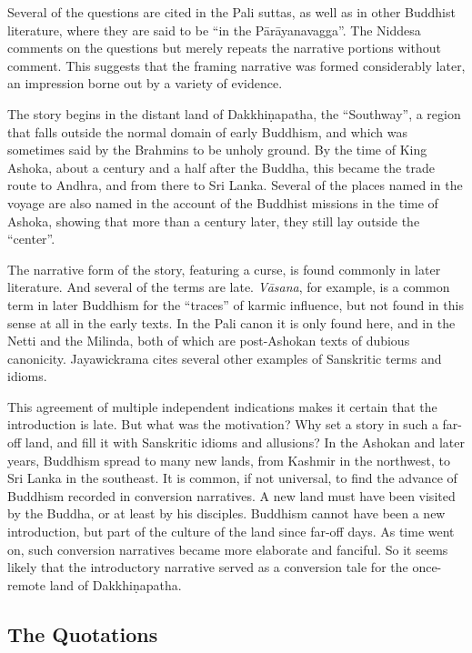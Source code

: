 \documentclass[12pt,openany]{book}%
\begin{document}
Several of the questions are cited in the Pali suttas, as well as in other Buddhist literature, where they are said to be “in the \textsanskrit{Pārāyanavagga}”. The Niddesa comments on the questions but merely repeats the narrative portions without comment. This suggests that the framing narrative was formed considerably later, an impression borne out by a variety of evidence.

The story begins in the distant land of \textsanskrit{Dakkhiṇapatha}, the “Southway”, a region that falls outside the normal domain of early Buddhism, and which was sometimes said by the Brahmins to be unholy ground. By the time of King Ashoka, about a century and a half after the Buddha, this became the trade route to Andhra, and from there to Sri Lanka. Several of the places named in the voyage are also named in the account of the Buddhist missions in the time of Ashoka, showing that more than a century later, they still lay outside the “center”.

The narrative form of the story, featuring a curse, is found commonly in later literature. And several of the terms are late. \textit{\textsanskrit{Vāsana}}, for example, is a common term in later Buddhism for the “traces” of karmic influence, but not found in this sense at all in the early texts. In the Pali canon it is only found here, and in the Netti and the Milinda, both of which are post-Ashokan texts of dubious canonicity. Jayawickrama cites several other examples of Sanskritic terms and idioms.

This agreement of multiple independent indications makes it certain that the introduction is late. But what was the motivation? Why set a story in such a far-off land, and fill it with Sanskritic idioms and allusions? In the Ashokan and later years, Buddhism spread to many new lands, from Kashmir in the northwest, to Sri Lanka in the southeast. It is common, if not universal, to find the advance of Buddhism recorded in conversion narratives. A new land must have been visited by the Buddha, or at least by his disciples. Buddhism cannot have been a new introduction, but part of the culture of the land since far-off days. As time went on, such conversion narratives became more elaborate and fanciful. So it seems likely that the introductory narrative served as a conversion tale for the once-remote land of \textsanskrit{Dakkhiṇapatha}.

\subsection*{The Quotations}
\end{document}
